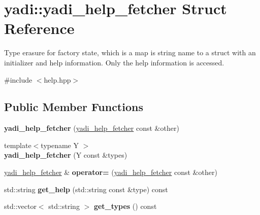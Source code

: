 \hypertarget{structyadi_1_1yadi__help__fetcher}{}\section{yadi\+:\+:yadi\+\_\+help\+\_\+fetcher Struct Reference}
\label{structyadi_1_1yadi__help__fetcher}


Type erasure for factory state, which is a map is string name to a struct with an initializer and help information. Only the help information is accessed.  




{\ttfamily \#include $<$help.\+hpp$>$}

\subsection*{Public Member Functions}
\begin{DoxyCompactItemize}
\item 
\mbox{\label{structyadi_1_1yadi__help__fetcher_a0ac5d533a3d64ebbc8a323d82c6c81e9}} 
{\bfseries yadi\+\_\+help\+\_\+fetcher} (\hyperlink{structyadi_1_1yadi__help__fetcher}{yadi\+\_\+help\+\_\+fetcher} const \&other)
\item 
\mbox{\label{structyadi_1_1yadi__help__fetcher_af9365b5dafe70409a3600b8c020ff8c4}} 
{\footnotesize template$<$typename Y $>$ }\\{\bfseries yadi\+\_\+help\+\_\+fetcher} (Y const \&types)
\item 
\mbox{\label{structyadi_1_1yadi__help__fetcher_ae14eeeac1e6bc8331716bc04ec8f749f}} 
\hyperlink{structyadi_1_1yadi__help__fetcher}{yadi\+\_\+help\+\_\+fetcher} \& {\bfseries operator=} (\hyperlink{structyadi_1_1yadi__help__fetcher}{yadi\+\_\+help\+\_\+fetcher} const \&other)
\item 
\mbox{\label{structyadi_1_1yadi__help__fetcher_ae5619cd8452d605167e680f6af5265b8}} 
std\+::string {\bfseries get\+\_\+help} (std\+::string const \&type) const
\item 
\mbox{\label{structyadi_1_1yadi__help__fetcher_acc545e6b22321f27b0801a7af501b3e3}} 
std\+::vector$<$ std\+::string $>$ {\bfseries get\+\_\+types} () const
\end{DoxyCompactItemize}


